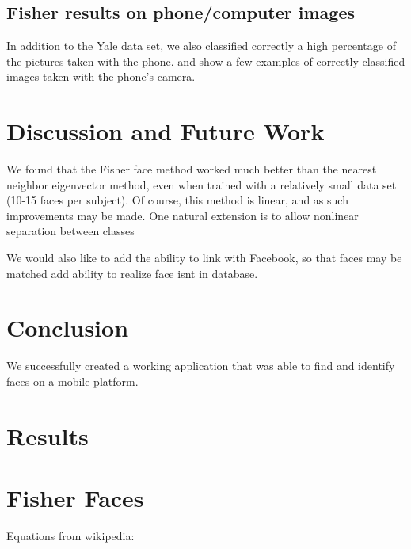 


\subsection{Fisher results on phone/computer images}

In addition to the Yale data set, we also classified correctly a high
percentage of the pictures taken with the phone.
 and
 show a few examples of correctly
classified images taken with the phone's camera.





\section{Discussion and Future Work}

We found that the Fisher face method worked much better than the
nearest neighbor eigenvector method, even when trained with a
relatively small data set (10-15 faces per subject).  Of course, this
method is linear, and as such improvements may be made.  One natural
extension is to allow nonlinear separation between classes 


We would also like to add the ability to link with Facebook, so that faces may be matched 
add ability to realize face isnt in database.

\section{Conclusion}


We successfully created a working application that was able to find
and identify faces on a mobile platform.


\section{Results}




\section{Fisher Faces}

Equations from wikipedia:

